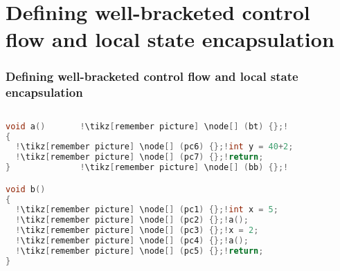 \documentclass[aspectratio=169]{beamer}
\begin{document}
\section{Defining well-bracketed control flow and local state  encapsulation}

\newcommand{\drawpc}[1]{

}

\begin{frame}[fragile]
  \frametitle{Defining well-bracketed control flow and local state encapsulation}
  \begin{columns}
    \begin{column}{0.5\textwidth}
\begin{lstlisting}[language=C, escapechar=!]
void a()       !\tikz[remember picture] \node[] (bt) {};! 
{
  !\tikz[remember picture] \node[] (pc6) {};!int y = 40+2;
  !\tikz[remember picture] \node[] (pc7) {};!return;      
}              !\tikz[remember picture] \node[] (bb) {};!

void b()
{
  !\tikz[remember picture] \node[] (pc1) {};!int x = 5;
  !\tikz[remember picture] \node[] (pc2) {};!a();
  !\tikz[remember picture] \node[] (pc3) {};!x = 2;
  !\tikz[remember picture] \node[] (pc4) {};!a();
  !\tikz[remember picture] \node[] (pc5) {};!return;   
}
\end{lstlisting}
    \end{column}
    \begin{column}{0.5\textwidth}
    \end{column}
  \end{columns}
\end{frame}
\end{document}
